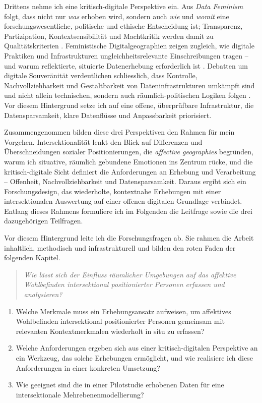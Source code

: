 Drittens nehme ich eine kritisch-digitale Perspektive ein. Aus \emph{Data Feminism} folgt, dass nicht nur \emph{was} erhoben wird, sondern auch \emph{wie} und \emph{womit} eine forschungswesentliche, politische und ethische Entscheidung ist; Transparenz, Partizipation, Kontextsensibilität und Machtkritik werden damit zu Qualitätskriterien \parencite{dignazioDataFeminism2020}. Feministische Digitalgeographien zeigen zugleich, wie digitale Praktiken und Infrastrukturen ungleichheitsrelevante Einschreibungen tragen -- und warum reflektierte, situierte Datenerhebung erforderlich ist \parencite{elwoodFeministDigitalGeographies2018}. Debatten um digitale Souveränität verdeutlichen schliesslich, dass Kontrolle, Nachvollziehbarkeit und Gestaltbarkeit von Dateninfrastrukturen umkämpft sind und nicht allein technischen, sondern auch räumlich-politischen Logiken folgen \parencite{glaszeContestedSpatialitiesDigital2023}. Vor diesem Hintergrund setze ich auf eine offene, überprüfbare Infrastruktur, die Datensparsamkeit, klare Datenflüsse und Anpassbarkeit priorisiert.

Zusammengenommen bilden diese drei Perspektiven den Rahmen für mein Vorgehen. Intersektionalität lenkt den Blick auf Differenzen und Überschneidungen sozialer Positionierungen, die \emph{affective geographies} begründen, warum ich situative, räumlich gebundene Emotionen ins Zentrum rücke, und die kritisch-digitale Sicht definiert die Anforderungen an Erhebung und Verarbeitung -- Offenheit, Nachvollziehbarkeit und Datensparsamkeit. Daraus ergibt sich ein Forschungsdesign, das wiederholte, kontextnahe Erhebungen mit einer intersektionalen Auswertung auf einer offenen digitalen Grundlage verbindet. Entlang dieses Rahmens formuliere ich im Folgenden die Leitfrage sowie die drei dazugehörigen Teilfragen.



Vor diesem Hintergrund leite ich die Forschungsfragen ab. Sie rahmen die Arbeit inhaltlich, methodisch und infrastrukturell und bilden den roten Faden der folgenden Kapitel.

\begin{quote}
\emph{Wie lässt sich der Einfluss räumlicher Umgebungen auf das affektive Wohlbefinden intersektional positionierter Personen erfassen und analysieren?}
\end{quote}

\begin{enumerate}
    \item Welche Merkmale muss ein Erhebungsansatz aufweisen, um affektives Wohlbefinden intersektional positionierter Personen gemeinsam mit relevanten Kontextmerkmalen wiederholt in situ zu erfassen?
    \item Welche Anforderungen ergeben sich aus einer kritisch-digitalen Perspektive an ein Werkzeug, das solche Erhebungen ermöglicht, und wie realisiere ich diese Anforderungen in einer konkreten Umsetzung?
    \item Wie geeignet sind die in einer Pilotstudie erhobenen Daten für eine intersektionale Mehrebenenmodellierung?
\end{enumerate}

